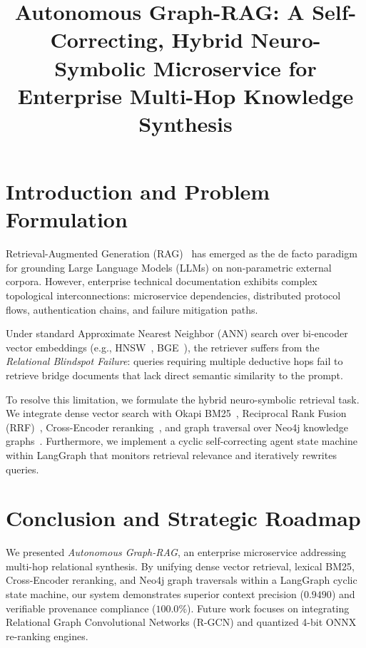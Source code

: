 \documentclass[conference]{IEEEtran}
\begin{document}
\title{Autonomous Graph-RAG: A Self-Correcting, Hybrid Neuro-Symbolic Microservice for Enterprise Multi-Hop Knowledge Synthesis}

\author{
}

\maketitle



\section{Introduction and Problem Formulation}
\label{sec:introduction}
Retrieval-Augmented Generation (RAG)~\cite{lewis2020rag} has emerged as the de facto paradigm for grounding Large Language Models (LLMs) on non-parametric external corpora. However, enterprise technical documentation exhibits complex topological interconnections: microservice dependencies, distributed protocol flows, authentication chains, and failure mitigation paths.

Under standard Approximate Nearest Neighbor (ANN) search over bi-encoder vector embeddings (e.g., HNSW~\cite{malkov2018hnsw}, BGE~\cite{xiao2023bge}), the retriever suffers from the \textit{Relational Blindspot Failure}: queries requiring multiple deductive hops fail to retrieve bridge documents that lack direct semantic similarity to the prompt.

To resolve this limitation, we formulate the hybrid neuro-symbolic retrieval task. We integrate dense vector search with Okapi BM25~\cite{robertson2009bm25}, Reciprocal Rank Fusion (RRF)~\cite{cormack2009rrf}, Cross-Encoder reranking~\cite{nogueira2019monobert}, and graph traversal over Neo4j knowledge graphs~\cite{pan2024graphrag,edge2024graphragmicrosoft}. Furthermore, we implement a cyclic self-correcting agent state machine~\cite{asai2023selfrag,shao2023iterretgen} within LangGraph that monitors retrieval relevance and iteratively rewrites queries.





\section{Conclusion and Strategic Roadmap}
\label{sec:conclusion}
We presented \textit{Autonomous Graph-RAG}, an enterprise microservice addressing multi-hop relational synthesis. By unifying dense vector retrieval, lexical BM25, Cross-Encoder reranking, and Neo4j graph traversals within a LangGraph cyclic state machine, our system demonstrates superior context precision ($0.9490$) and verifiable provenance compliance ($100.0\%$). Future work focuses on integrating Relational Graph Convolutional Networks (R-GCN) and quantized 4-bit ONNX re-ranking engines.



\end{document}
